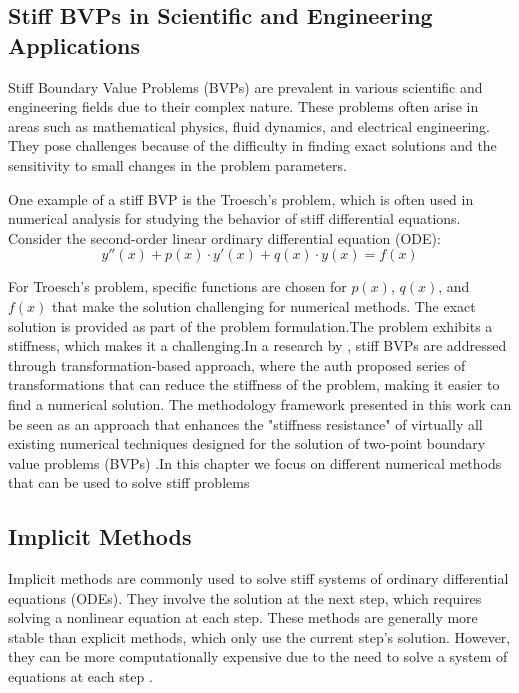 \documentclass{report}
\begin{document}
\subsection{Stiff BVPs in Scientific and Engineering Applications}
Stiff Boundary Value Problems (BVPs) are prevalent in various scientific and engineering fields due to their complex nature. These problems often arise in areas such as mathematical physics, fluid dynamics, and electrical engineering. They pose challenges because of the difficulty in finding exact solutions and the sensitivity to small changes in the problem parameters.

One example of a stiff BVP is the Troesch's problem, which is often used in numerical analysis for studying the behavior of stiff differential equations.
Consider the second-order linear ordinary differential equation (ODE):
\begin{equation}
    y''(x) + p(x) \cdot y'(x) + q(x) \cdot y(x) = f(x)
\end{equation}

For Troesch's problem, specific functions are chosen for $p(x)$, $q(x)$, and $f(x)$ that make the solution challenging for numerical methods. The exact solution is provided as part of the problem formulation.The problem exhibits a stiffness, which makes it a challenging.In a research by \cite{dragunov2021transformation}, stiff BVPs are addressed through transformation-based approach, where the auth \cite{dragunov2021transformation} proposed series of transformations that can reduce the stiffness of the problem, making it easier to find a numerical solution. The methodology framework presented in this work can be seen as an approach that enhances the "stiffness resistance" of virtually all existing numerical techniques designed for the solution of two-point boundary value problems (BVPs) \cite{dragunov2021transformation}.In this chapter we focus on different numerical methods that can be used to solve stiff problems

\subsection{Implicit Methods}
Implicit methods are commonly used to solve stiff systems of ordinary differential equations (ODEs). They involve the solution at the next step, which requires solving a nonlinear equation at each step. These methods are generally more stable than explicit methods, which only use the current step's solution. However, they can be more computationally expensive due to the need to solve a system of equations at each step \cite{thohura2013numerical}.
\end{document}
